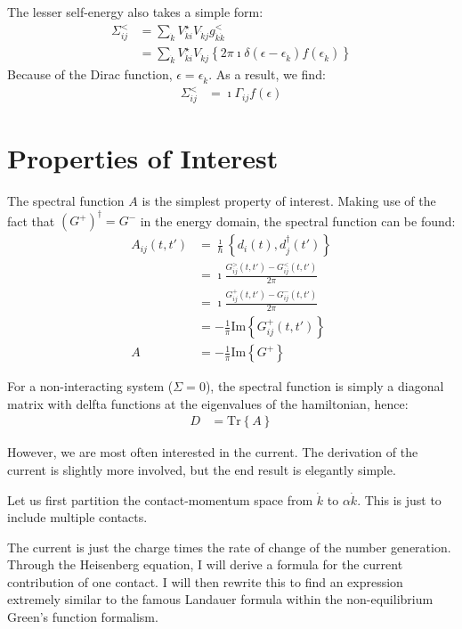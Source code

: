 The lesser self-energy also takes a simple form:
\begin{align*}
\Sigma^<_{ij} &= \sum_{\dot{k}} V_{\dot{k}i}^\star V_{\dot{k}j} g_{\dot{k}\dot{k}}^< \\&= \sum_{\dot{k}} V_{\dot{k}i}^\star V_{\dot{k}j} \left\{2\pi\imath \delta(\epsilon-\epsilon_{\dot{k}}) f(\epsilon_{\dot{k}})\right\}
\end{align*}
Because of the Dirac function, $\epsilon=\epsilon_{\dot{k}}$. As a result, we find:
\begin{align*}
\Sigma^<_{ij} &= \imath \Gamma_{ij} f(\epsilon)
\end{align*}
\section{Properties of Interest}
\label{sec:properties}
The spectral function $A$ is the simplest property of interest. Making use of the fact that $\left(G^+\right)^\dagger = G^-$ in the energy domain, the spectral function can be found:
\begin{align*}
A_{ij}(t, t') &= \frac{\imath}{\hbar} \left\{ d_i(t), d_j^\dagger(t')\right\} \\
&= \imath \frac{ G^>_{ij}(t, t') - G^<_{ij}(t, t')}{2\pi} \\
&= \imath \frac{G^+_{ij}(t, t') - G^-_{ij}(t, t')}{2\pi}\\
&= - \frac{1}{\pi} \text{Im}\left\{ G^+_{ij}(t, t')\right\} \\
A &=- \frac{1}{\pi} \text{Im}\left\{ G^+\right\}
\end{align*}

For a non-interacting system ($\Sigma=0$), the spectral function is simply a diagonal matrix with delfta functions at the eigenvalues of the hamiltonian, hence:
\begin{align}
D &= \text{Tr}\left\{A\right\}
\label{eq:dos}
\end{align}



However, we are most often interested in the current. The derivation of the current is slightly more involved, but the end result is elegantly simple.

Let us first partition the contact-momentum space from $\dot{k}$ to $\alpha\dot{k}$. This is just to include multiple contacts.

The current is just the charge times the rate of change of the number generation. Through the Heisenberg equation, I will derive a formula for the current contribution of one contact. I will then rewrite this to find an expression extremely similar to the famous Landauer formula within the non-equilibrium Green's function formalism.

